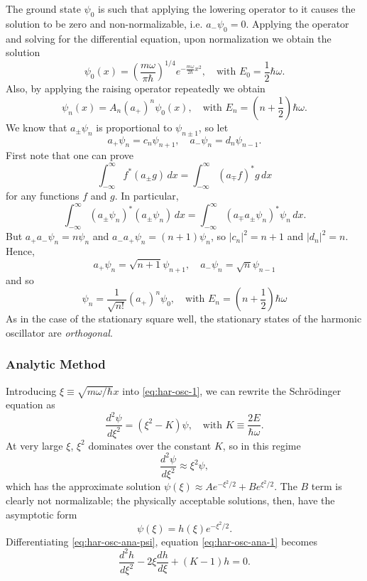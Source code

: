 \documentclass{article}
\begin{document}
The ground state $\psi_0$ is such that applying the lowering operator to it
causes the solution to be zero and non-normalizable, i.e. $a_-\psi_0 = 0$.
Applying the operator and solving for the differential equation, upon
normalization we obtain the solution
\begin{equation} \label{eq:har-osc-alg-grd-st}
  \psi_0(x) = \left(\frac{m\omega}{\pi\hbar}\right)^{1/4}
  e^{-\frac{m\omega}{2\hbar}x^2},\quad
  \text{with } E_0 = \frac{1}{2}\hbar\omega.
\end{equation}
Also, by applying the raising operator repeatedly we obtain \[
  \psi_n(x) = A_n(a_+)^n\psi_0(x), \quad
  \text{with } E_n = \left(n + \frac{1}{2}\right)\hbar\omega.
\] We know that $a_{\pm}\psi_n$ is proportional to $\psi_{n \pm 1}$, so let \[
  a_+\psi_n = c_n\psi_{n + 1}, \quad a_-\psi_n = d_n\psi_{n - 1}.
  \] First note that one can prove \[
  \int_{-\infty}^{\infty} f^*(a_{\pm}g) \,dx
  = \int_{-\infty}^{\infty} (a_{\mp}f)^*g \,dx
\] for any functions $f$ and $g$. In particular, \[
  \int_{-\infty}^{\infty} (a_{\pm}\psi_n)^*(a_{\pm}\psi_n) \,dx
  = \int_{-\infty}^{\infty} (a_{\mp}a_{\pm}\psi_n)^*\psi_n \,dx.
\] But $a_+a_-\psi_n = n\psi_n$ and $a_-a_+\psi_n = (n + 1)\psi_n$, so $|c_n|^2
= n + 1$ and $|d_n|^2 = n$. Hence,
\begin{equation} \label{eq:har-osc-alg-op}
  \boxed{
    a_+\psi_n = \sqrt{n + 1}\psi_{n + 1}, \quad
    a_-\psi_n = \sqrt{n}\psi_{n - 1}
  }
\end{equation}
and so
\begin{equation} \label{eq:har-osc-alg-sta-st}
  \boxed{
    \psi_n = \frac{1}{\sqrt{n!}}(a_+)^n\psi_0, \quad
    \text{with } E_n = \left(n + \frac{1}{2}\right)\hbar\omega
  }
\end{equation}
As in the case of the stationary square well, the stationary states of the
harmonic oscillator are \emph{orthogonal}.

\subsubsection{Analytic Method}

Introducing $\xi \equiv \sqrt{m\omega/\hbar}x$ into \eqref{eq:har-osc-1}, we
can rewrite the Schr\"{o}dinger equation as
\begin{equation} \label{eq:har-osc-ana-1}
  \frac{d^2\psi}{d\xi^2} = (\xi^2 - K)\psi,\quad
  \text{with } K \equiv \frac{2E}{\hbar\omega}.
\end{equation}
At very large $\xi$, $\xi^2$ dominates over the constant $K$, so in this regime
\[
  \frac{d^2\psi}{d\xi^2} \approx \xi^2\psi,
\] which has the approximate solution $\psi(\xi) \approx Ae^{-\xi^2/2} +
Be^{\xi^2/2}$. The $B$ term is clearly not normalizable; the physically
acceptable solutions, then, have the asymptotic form
\begin{equation} \label{eq:har-osc-ana-psi}
  \psi(\xi) = h(\xi)e^{-\xi^2/2}.
\end{equation}
Differentiating \eqref{eq:har-osc-ana-psi}, equation \eqref{eq:har-osc-ana-1}
becomes
\begin{equation} \label{eq:har-osc-ana-2}
  \frac{d^2h}{d\xi^2} - 2\xi\frac{dh}{d\xi} + (K - 1)h = 0.
\end{equation}
\end{document}
